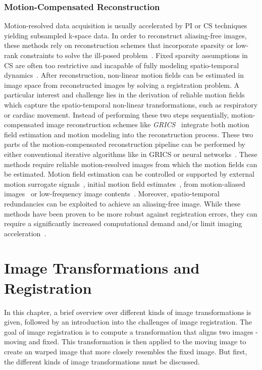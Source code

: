 \subsubsection{Motion-Compensated Reconstruction} \label{SubSubSec:ReconstructionPipelines}
Motion-resolved data acquisition is usually accelerated by PI or CS techniques yielding subsampled k-space data. In order to reconstruct aliasing-free images, these methods rely on reconstruction schemes that incorporate sparsity or low-rank constraints to solve the ill-posed problem~\cite{CS-MRI,ParallelMRI,LowRank+SparseMRI}. Fixed sparsity assumptions in CS are often too restrictive and incapable of fully modeling spatio-temporal dynamics~\cite{Kuestner2022}. After reconstruction, non-linear motion fields can be estimated in image space from reconstructed images by solving a registration problem. A particular interest and challenge lies in the derivation of reliable motion fields which capture the spatio-temporal non-linear transformations, such as respiratory or cardiac movement. Instead of performing these two steps sequentially, motion-compensated image reconstruction schemes like \emph{GRICS}~\cite{GRICS} integrate both motion field estimation and motion modeling into the reconstruction process. These two parts of the motion-compensated reconstruction pipeline can be performed by either conventional iterative algorithms like in GRICS or neural networks~\cite{Kuestner2022}. These methods require reliable motion-resolved images from which the motion fields can be estimated. Motion field estimation can be controlled or supported by external motion surrogate signals~\cite{CorderoGrande2016}, initial motion field estimates~\cite{Atkinson1997,Batchelor2005}, from motion-aliased images~\cite{Haskell2019} or low-frequency image contents~\cite{Usman2020}. Moreover, spatio-temporal redundancies can be exploited to achieve an aliasing-free image. While these methods have been proven to be more robust against registration errors, they can require a significantly increased computational demand and/or limit imaging acceleration~\cite{Kuestner2022}. 


\section{Image Transformations and Registration} \label{Sec:ImageTransformationsAndRegistration}
In this chapter, a brief overview over different kinds of image transformations is given, followed by an introduction into the challenges of image registration. The goal of image registration is to compute a transformation that aligns two images - moving and fixed. This transformation is then applied to the moving image to create an warped image that more closely resembles the fixed image. But first, the different kinds of image transformations must be discussed.

